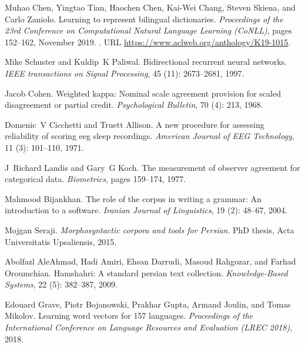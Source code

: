 \documentclass{article}
\begin{document}
\begin{thebibliography}{45}
Muhao Chen, Yingtao Tian, Haochen Chen, Kai-Wei Chang, Steven Skiena, and Carlo
  Zaniolo.
\newblock Learning to represent bilingual dictionaries.
\newblock \emph{Proceedings of the 23rd Conference on Computational Natural
  Language Learning (CoNLL)}, pages 152--162, November 2019.
\newblock {}.
\newblock URL \url{https://www.aclweb.org/anthology/K19-1015}.

Mike Schuster and Kuldip~K Paliwal.
\newblock Bidirectional recurrent neural networks.
\newblock \emph{IEEE transactions on Signal Processing}, 45
  (11): 2673--2681, 1997.

Jacob Cohen.
\newblock Weighted kappa: Nominal scale agreement provision for scaled
  disagreement or partial credit.
\newblock \emph{Psychological Bulletin}, 70 (4): 213, 1968.

Domenic~V Cicchetti and Truett Allison.
\newblock A new procedure for assessing reliability of scoring eeg sleep
  recordings.
\newblock \emph{American Journal of EEG Technology}, 11 (3):
  101--110, 1971.

J~Richard Landis and Gary~G Koch.
\newblock The measurement of observer agreement for categorical data.
\newblock \emph{Biometrics}, pages 159--174, 1977.

Mahmood Bijankhan.
\newblock The role of the corpus in writing a grammar: An introduction to a
  software.
\newblock \emph{Iranian Journal of Linguistics}, 19 (2):
  48--67, 2004.

Mojgan Seraji.
\newblock \emph{Morphosyntactic corpora and tools for Persian}.
\newblock PhD thesis, Acta Universitatis Upsaliensis, 2015.

Abolfazl AleAhmad, Hadi Amiri, Ehsan Darrudi, Masoud Rahgozar, and Farhad
  Oroumchian.
\newblock Hamshahri: A standard persian text collection.
\newblock \emph{Knowledge-Based Systems}, 22 (5): 382--387,
  2009.

Edouard Grave, Piotr Bojanowski, Prakhar Gupta, Armand Joulin, and Tomas
  Mikolov.
\newblock Learning word vectors for 157 languages.
\newblock \emph{Proceedings of the International Conference on Language
  Resources and Evaluation (LREC 2018)}, 2018.


\end{thebibliography}
\end{document}
